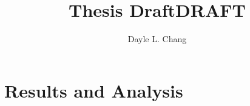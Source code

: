 \documentclass{report}
\begin{document}
\ifdraft
	\author{Dayle L. Chang}
	\title{Thesis Draft}
	\maketitle
    \tableofcontents
\else
	\frontmatter
    \title{DRAFT}
    \tableofcontents
    \listoffigures
    \mainmatter
\fi

\pagebreak


	

	\chapter{Results and Analysis} \label{results}
	


\pagebreak
\ifdraft
 	\printbibliography
\else
	\backmatter
    
	 
\fi
\end{document}
